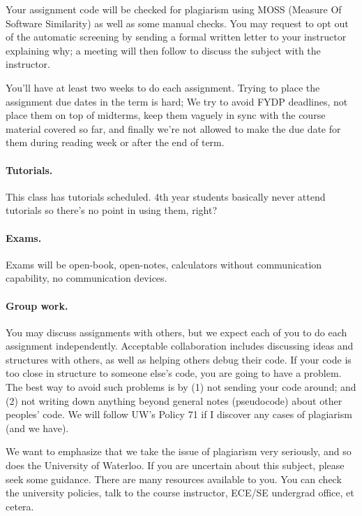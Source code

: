 \documentclass[letterpaper,10pt]{article}
\begin{document}
Your assignment code will be checked for plagiarism using MOSS (Measure Of Software Similarity) as well as some manual checks. You may request to opt out of the automatic screening by sending a formal written letter to your instructor explaining why; a meeting will then follow to discuss the subject with the instructor.

You'll have at least two weeks to do each assignment. Trying to place the assignment due dates in the term is hard; We try to avoid FYDP deadlines, not place them on top of midterms, keep them vaguely in sync with the course material covered so far, and finally we're not allowed to make the due date for them during reading week or after the end of term. 

\paragraph{Tutorials.} This class has tutorials scheduled. 4th year students basically never attend tutorials so there's no point in using them, right?

\paragraph{Exams.} Exams will be open-book, open-notes, calculators without communication capability, no communication devices.

\paragraph{Group work.} 
You may discuss assignments with others, but we expect each of you to
do each assignment independently. Acceptable collaboration includes
discussing ideas and structures with others, as well as helping others
debug their code. If your code is too close in structure to someone
else's code, you are going to have a problem. The best way to avoid
such problems is by (1) not sending your code around; and (2) not
writing down anything beyond general notes (pseudocode) about other
peoples' code. We will follow UW's Policy 71 if I discover any cases of
plagiarism (and we have). 

We want to emphasize that we take the issue of plagiarism very seriously, and so does the University of Waterloo. If you are uncertain about this subject, please seek some guidance. There are many resources available to you. You can check the university policies, talk to the course instructor, ECE/SE undergrad office, et cetera.
\end{document}
